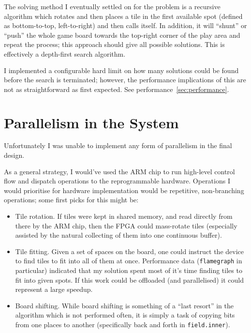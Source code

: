 \documentclass[11pt]{article}
\begin{document}
The solving method I eventually settled on for the problem is a recursive algorithm which rotates and then places a tile in the first available spot (defined as bottom-to-top, left-to-right) and then calls itself.
In addition, it will ``shunt'' or ``push'' the whole game board towards the top-right corner of the play area and repeat the process; this approach should give all possible solutions.
This is effectively a depth-first search algorithm.

I implemented a configurable hard limit on how many solutions could be found before the search is terminated; however, the performance implications of this are not as straightforward as first expected.
See performance~\ref{sec:performance}.

\newpage
\section{Parallelism in the System}


Unfortunately I was unable to implement any form of parallelism in the final design.

As a general strategy, I would've used the ARM chip to run high-level control flow and dispatch operations to the reprogrammable hardware.
Operations I would prioritise for hardware implementation would be repetitive, non-branching operations; some first picks for this might be:

\begin{itemize}
  \item Tile rotation.
    If tiles were kept in shared memory, and read directly from there by the ARM chip, then the FPGA could mass-rotate tiles (especially assisted by the natural collecting of them into one continuous buffer).
  \item Tile fitting.
    Given a set of spaces on the board, one could instruct the device to find tiles to fit into all of them at once.
    Performance data (\verb|flamegraph| in particular) indicated that my solution spent most of it's time finding tiles to fit into given spots.
    If this work could be offloaded (and parallelised) it could represent a large speedup.
  \item Board shifting.
    While board shifting is something of a ``last resort'' in the algorithm which is not performed often, it is simply a task of copying bits from one places to another (specifically back and forth in \verb|field.inner|).
\end{itemize}
\end{document}
